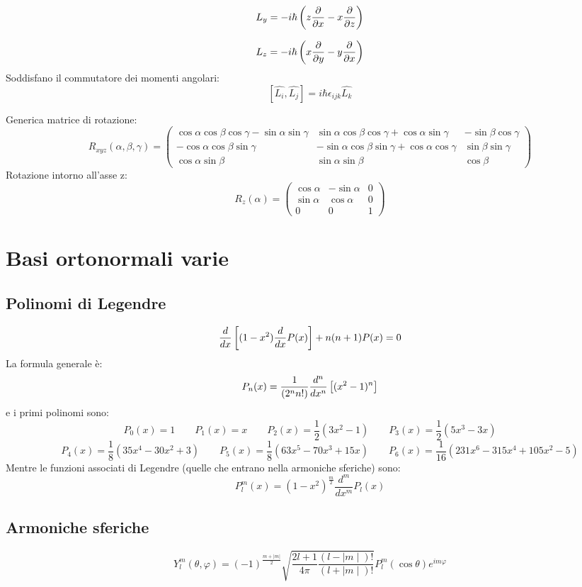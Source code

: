 $$
L_y = -i\hbar \left(z {\partial\over \partial x} - x {\partial\over \partial z}\right)
$$

$$ L_z = -i\hbar \left(x {\partial\over \partial y} - y {\partial\over \partial x}\right)
$$
Soddisfano il commutatore dei momenti angolari:
$$
\left[\hat{L_i},\hat{L_j}\right]= i \hbar \epsilon_{ijk} \hat{L_k}
$$


Generica matrice di rotazione:
$$
R_{xyz}(\alpha, \beta, \gamma) = \begin{pmatrix} \cos \alpha \cos \beta \cos \gamma - 
\sin \alpha \sin \gamma & \sin \alpha \cos \beta \cos \gamma + \cos \alpha \sin 
\gamma & -\sin \beta \cos \gamma \\ -\cos \alpha \cos \beta \sin \gamma & -
\sin \alpha \cos \beta \sin \gamma + \cos \alpha \cos \gamma & \sin \beta \sin \gamma \\ 
\cos \alpha \sin \beta & \sin \alpha \sin \beta & \cos \beta \end{pmatrix}
$$
Rotazione intorno all'asse z:
$$
R_z(\alpha) = \begin{pmatrix} \cos \alpha & -\sin \alpha & 0 \\ \sin \alpha & \cos \alpha & 0 \\ 0 & 0 & 1 \end{pmatrix}
$$
\section{Basi ortonormali varie}
\subsection{Polinomi di Legendre}
$$
{d \over dx} \left[ (1-x^2) {d \over dx} P(x) \right] + n(n+1)P(x) = 0
$$
La formula generale è:
$$
P_n(x) = \frac{1}{(2^n n!)}{d^n \over dx^n } \left[ (x^2-1)^n \right] 
$$
e i primi polinomi sono:
$$
	P_0(x)=1 \qquad	P_1(x)=x	 \qquad 	P_2(x) = \frac{1}{2}(3x^2 - 1)		\qquad P_3(x) = \frac{1}{2}(5x^3 - 3x)
$$
$$
	\qquad P_4(x) = \frac{1}{8}(35x^4 - 30x^2 + 3) \qquad P_5(x) = \frac{1}{8}(63x^5 - 70x^3 + 15x)
	\qquad P_6(x) = \frac{1}{16}(231x^6 - 315x^4 + 105x^2 - 5)
$$
Mentre le funzioni associati di Legendre (quelle che entrano nella armoniche sferiche) sono:
$$
P_{l}^m (x) = (1-x^2)^{\frac{m}{2}}\frac{d^m}{dx^m} P_l (x)
$$
\subsection{Armoniche sferiche}

$$
 Y^m_l (\theta,\varphi)= {(-1)^{\frac{m+|m|}{2}}} \sqrt{ \frac{2l+1}{4\pi}
\frac{(l-\mid m \mid)!}{(l+\mid m \mid)!} }
P^{ m}_l(\cos\theta) e^{im\varphi} 
$$

